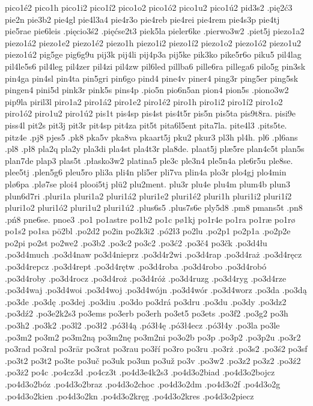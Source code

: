 {{pico1é2
pico1h
pico1i2
pico1í2
pico1o2
pico1ó2
pico1u2
pico1ú2
pid3s2
.pię2ć3
pie2n
pie3b2
pie4gl
pie4l3a4
pie4r3o
pie4reb
pie4rei
pie4rem
pie4s3p
pie4tj
pie5rae
pie6leis
.pięcio3ś2
.pięćse2t3
piek5la
pieler6ke
.pierwo3w2
.piet5j
piezo1a2
piezo1á2
piezo1e2
piezo1é2
piezo1h
piezo1i2
piezo1í2
piezo1o2
piezo1ó2
piezo1u2
piezo1ú2
pig5ge
pig6g9u
pij3k
pij4li
pij4p3a
pij5ke
pik3ko
pike5r6o
piku5
pil4lag
pil4le5s6
pil4leg
pil4zer
pil4zi
pil4zw
pil6led
pillba6
pille6ra
pillega6
pilo5g
pin3sk
pin4ga
pin4sl
pin4ta
pin5gri
pin6go
pind4
pine4v
piner4
ping3r
ping5er
ping5sk
pingen4
pini5d
pink3r
pink5s
pins4p
.pio5n
pio6n5an
pion4
pion5s
.piono3w2
pip9la
piril3l
piro1a2
piro1á2
piro1e2
piro1é2
piro1h
piro1i2
piro1í2
piro1o2
piro1ó2
piro1u2
piro1ú2
pis1t
pis4sp
pis4st
pis4t5r
pis5n
pis5ta
pis9t8ra.
pisi9e
piss4l
pit2s
pit3j
pit3r
pit4sp
pit4za
pit5t
pita6l5ent
pita7la.
pite4l3
.pits5te.
pitz4e
.pj8
pjes5
.pk8
pka5v
pka8va
pkaart5j
pku2
pkur3
pl3h
pl4h.
pl6
.pl6ans
.pl8
.pł8
pla2q
pla2y
pla3di
pla4st
pla4t3r
pla8de.
plaat5j
plæ5re
plan4c5t
plan5s
plan7de
plap3
plas5t
.płasko3w2
platina5
ple3c
ple3n4
ple5n4a
ple6r5u
ple8se.
plee5tj
.plen5g6
pleu5ro
pli3a
pli4n
pli5er
pli7va
plin4a
plo3r
plo4gj
plo4min
plø6pa
.plø7se
ploi4
plooi5tj
plü2
plu2ment.
plu3r
plu4e
plu4m
plum4b
plun3
plun6d7ri
.pluri1a
pluri1a2
pluri1á2
pluri1e2
pluri1é2
pluri1h
pluri1i2
pluri1í2
pluri1o2
pluri1ó2
pluri1u2
pluri1ú2
.plus6s5
.plus7s6e
ply5d8
.pm8
pmans5t
.pn8
.pń8
pne6se.
pnoe3
.po1
po1astre
po1b2
po1c
pø1kj
po1r4e
po1ra
po1ræ
po1rø
po1s2
po1sa
pö2bl
.po2d2
po2in
po2k3i2
.pó2ł3
po2lu
.po2p1
po2p1a
.po2p2e
po2pi
po2st
po2we2
.po3b2
.po3c2
po3c2
.po3ć2
.po3č4
po3čk
.po3d4łu
.po3d4much
.po3d4naw
po3d4nieprz
.po3d4r2wi
.po3d4rap
.po3d4raż
.po3d4ręcz
.po3d4repcz
.po3d4rept
.po3d4rętw
.po3d4roba
.po3d4robo
.po3d4robó
.po3d4roby
.po3d4rocz
.po3d4roż
.po3d4róż
.po3d4ruzg
.po3d4ryg
.po3d4rze
.po3d4waj
.po3d4woi
.po3d4woj
.po3d4wójn
.po3d4wór
.po3d4worz
.po3da
.po3dą
.po3de
.po3dę
.po3dej
.po3diu
.po3do
po3drá
po3dru
.po3du
.po3dy
.po3dz2
.po3dź2
.po3e2k2s3
po3ems
po3erb
po3erh
po3et5
po3ets
.po3f2
.po3g2
po3h
.po3h2
.po3k2
.po3l2
.po3ł2
.pó3ł4ą
.pó3ł4ę
.pó3ł4ecz
.pó3ł4y
.po3la
po3le
.po3m2
po3m2
po3m2ną
po3m2nę
po3m2ni
po3o2b
po3p
.po3p2
.po3p2u
.po3r2
po3rad
po3ral
po3rär
po3rat
po3rau
po3ří
po3ro
po3ru
.po3rż
.po3s2
.po3ś2
po3sf
.po3t2
po3t2
po3te
po3uč
po3uk
po3un
po3už
po3v
.po3w2
.po3z2
po3z2
.po3ź2
.po3ż2
po4c
.po4cz3d
.po4cz3t
.po4d3e4k2s3
.po4d3o2biad
.po4d3o2bojcz
.po4d3o2bóz
.po4d3o2braz
.po4d3o2choc
.po4d3o2dm
.po4d3o2f
.po4d3o2g
.po4d3o2kien
.po4d3o2kn
.po4d3o2kręg
.po4d3o2kres
.po4d3o2piecz
}}
